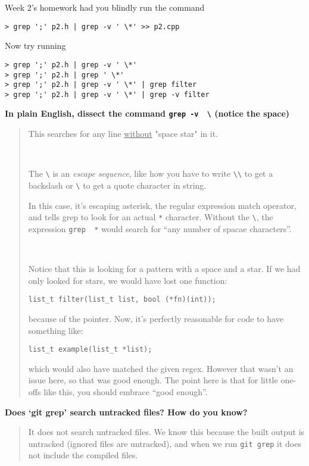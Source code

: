 \documentclass{article}
\begin{document}
\medskip
\noindent
Week 2's homework had you blindly run the command
\begin{lstlisting}
> grep ';' p2.h | grep -v ' \*' >> p2.cpp
\end{lstlisting}
%
Now try running
\begin{lstlisting}
> grep ';' p2.h | grep -v ' \*'
> grep ';' p2.h | grep ' \*'
> grep ';' p2.h | grep -v ' \*' | grep filter
> grep ';' p2.h | grep -v ' \*' | grep -v filter
\end{lstlisting}
%
\textbf{In plain English, dissect the command \texttt{grep -v \textquotesingle~\textbackslash*\textquotesingle} (notice the space)}
\begin{quote}
  \color{violet}
  This searches for any line \ul{without} "space star" in it.

  ~

  The \texttt{\textbackslash*} is an \emph{escape sequence}, like how you have
  to write \texttt{\textbackslash\textbackslash} to get a backslash or
  \texttt{\textbackslash\textquotedbl} to get a quote character in string.

  In this case, it's escaping asterisk, the regular expression match operator,
  and tells grep to look for an actual \texttt{*} character. Without the
  \texttt{\textbackslash}, the expression
  \texttt{grep~\textquotesingle~*\textquotesingle} would search for ``any number
  of spacae characters''.

  ~

  Notice that this is looking for a pattern with a space and a star. If we had
  only looked for stars, we would have lost one function:

  \texttt{list\_t filter(list\_t list, bool (*fn)(int));}

  because of the pointer. Now, it's perfectly reasonable for code to have
  something like:

  \texttt{list\_t example(list\_t *list);}

  which would also have matched the given regex. However that wasn't an issue
  here, so that was good enough. The point here is that for little one-offs
  like this, you should embrace ``good enough''.
\end{quote}



\vfill
\noindent
\textbf{Does `git grep' search untracked files? How do you know?}
\begin{quote}
  \color{violet}
  It does not search untracked files. We know this because the built output is
  untracked (ignored files are untracked), and when we run \texttt{git~grep}
  it does not include the compiled files.
\end{quote}
\end{document}
